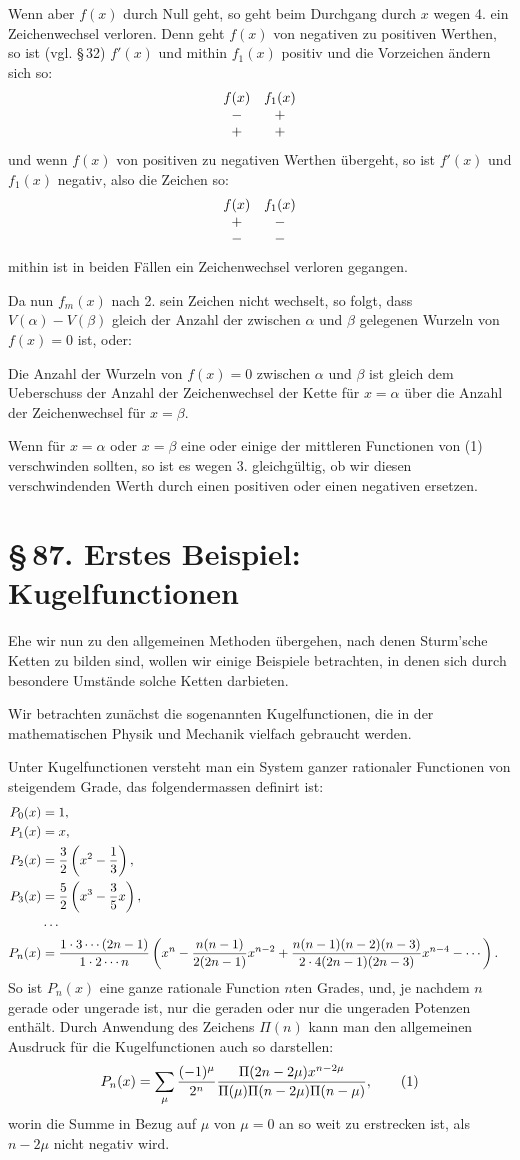\documentclass[11pt]{article}
\providecommand{\sect}[2]{\section*{\S\,#1. #2}}
\begin{document}
Wenn aber $f(x)$ durch Null geht, so geht beim Durchgang durch $x$ wegen 4. ein Zeichenwechsel verloren. Denn geht $f(x)$ von negativen zu positiven Werthen, so ist (vgl. \S\,32) $f'(x)$ und mithin $f_1(x)$ positiv und die Vorzeichen \"andern sich so:
\[
\begin{array}{cc}
 f(x)&f_1(x)\cr
 -&+\cr
 +&+
\end{array}
\]
und wenn $f(x)$ von positiven zu negativen Werthen \"ubergeht, so ist $f'(x)$ und $f_1(x)$ negativ, also die Zeichen so:
\[
\begin{array}{cc}
 f(x)&f_1(x)\cr
 +&-\cr
 -&-
\end{array}
\]
mithin ist in beiden F\"allen ein Zeichenwechsel verloren gegangen.

Da nun $f_m(x)$ nach 2. sein Zeichen nicht wechselt, so folgt, dass $V(\alpha)-V(\beta)$ gleich der Anzahl der zwischen $\alpha$ und $\beta$ gelegenen Wurzeln von $f(x)=0$ ist, oder:

Die Anzahl der Wurzeln von $f(x)=0$ zwischen $\alpha$ und $\beta$ ist gleich dem Ueberschuss der Anzahl der Zeichenwechsel der Kette f\"ur $x=\alpha$ \"uber die Anzahl der Zeichenwechsel f\"ur $x=\beta$.

Wenn f\"ur $x=\alpha$ oder $x=\beta$ eine oder einige der mittleren Functionen von (1) verschwinden sollten, so ist es wegen 3. gleichg\"ultig, ob wir diesen verschwindenden Werth durch einen positiven oder einen negativen ersetzen.

\sect{87}{Erstes Beispiel: Kugelfunctionen}

Ehe wir nun zu den allgemeinen Methoden \"ubergehen, nach denen Sturm'sche Ketten zu bilden sind, wollen wir einige Beispiele betrachten, in denen sich durch besondere Umst\"ande solche Ketten darbieten.

Wir betrachten zun\"achst die sogenannten Kugelfunctionen, die in der mathematischen Physik und Mechanik vielfach gebraucht werden.

Unter Kugelfunctionen versteht man ein System ganzer rationaler Functionen von steigendem Grade, das folgendermassen definirt ist:
\[
\begin{aligned}
        P_0(x)&=1,\cr
        P_1(x)&=x,\cr
        P_2(x)&={3\over2}\left(x^2-{1\over3}\right),\cr
        P_3(x)&={5\over2}\left(x^3-{3\over5}x\right),\cr
        &\cdots\cr
        P_n(x)&={1\cdot3\cdots(2n-1)\over1\cdot2\cdots n}
        \left(x^n-{n(n-1)\over2(2n-1)}x^{n-2}
        +{n(n-1)(n-2)(n-3)\over2\cdot4(2n-1)(2n-3)}x^{n-4}-\cdots\right).
\end{aligned}
\]
So ist $P_n(x)$ eine ganze rationale Function $n$ten Grades, und, je nachdem $n$ gerade oder ungerade ist, nur die geraden oder nur die ungeraden Potenzen enth\"alt. Durch Anwendung des Zeichens $\Pi(n)$ kann man den allgemeinen Ausdruck f\"ur die Kugelfunctionen auch so darstellen:
\begin{equation}
        P_n(x)=\sum_\mu {(-1)^\mu\over 2^n}
        {\Pi(2n-2\mu)x^{n-2\mu}\over \Pi(\mu)\Pi(n-2\mu)\Pi(n-\mu)},
\tag{1}
\end{equation}
worin die Summe in Bezug auf $\mu$ von $\mu=0$ an so weit zu erstrecken ist, als $n-2\mu$ nicht negativ wird.
\end{document}
